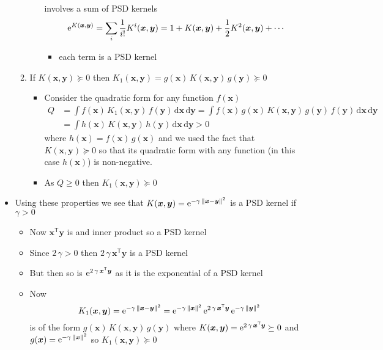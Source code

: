 \documentclass[11pt]{article}
\newcommand{\tr}{\textsf{T}}
\newcommand{\len}[1]{\left\| #1 \right\|}
\newcommand{\e}[1]{{\rm e}^{#1}}
\newcommand{\dd}{\mathrm{d}}
\begin{document}
\begin{itemize}
\begin{enumerate}
\begin{itemize}
involves a sum of PSD kernels
$$\e{K(\bm{x}, \bm{y})} = \sum_i \frac{1}{i!} K^i(\bm{x}, \bm{y})
          = 1 + K(\bm{x}, \bm{y}) + \frac{1}{2} K^2(\bm{x}, \bm{y}) +
           \cdots $$
\begin{itemize}
\item each term is a PSD kernel
\end{itemize}
\end{itemize}
\item If  \(K(\bm{x},\bm{y})\succeq0\) then
\(K_{1}(\bm{x}, \bm{y}) = g(\bm{x})\,K(\bm{x},\bm{y})\,g(\bm{y})
         \succeq 0\)
\begin{itemize}
\item Consider the quadratic form for any function \(f(\bm{x})\)
\begin{align*}
Q &= \int f(\bm{x})\, K_{1}(\bm{x}, \bm{y})\, f(\bm{y}) \, \dd
\bm{x} \, \dd \bm{y}
= \int f(\bm{x})\, g(\bm{x})\,K(\bm{x},\bm{y})\,g(\bm{y})\, f(\bm{y}) \, \dd
\bm{x} \, \dd \bm{y} \\
&=  \int h(\bm{x})\, K(\bm{x}, \bm{y})\, h(\bm{y}) \, \dd
\bm{x} \, \dd \bm{y} > 0
\end{align*}
where \(h(\bm{x}) = f(\bm{x})\,g(\bm{x})\) and we used the fact
that \(K(\bm{x}, \bm{y})\succeq 0\) so that its quadratic form
with any function (in this case \(h(\bm{x})\)) is non-negative.
\item As \(Q\geq0\) then \(K_{1}(\bm{x}, \bm{y}) \succeq0\)
\end{itemize}
\end{enumerate}
\item Using these properties we see that \(K(\bm{x}, \bm{y}) =
     \e{-\gamma\,\len{\bm{x}-\bm{y}}^2}\) is a PSD kernel if \(\gamma>0\)
\begin{itemize}
\item Now \(\bm{x}^\tr \bm{y}\) is and inner product so a PSD kernel
\item Since \(2\,\gamma>0\) then \(2\,\gamma\,\bm{x}^\tr \bm{y}\) is a
PSD kernel
\item But then so is \(\e{2\,\gamma\,\bm{x}^\tr \bm{y}}\) as it is the
exponential of a PSD kernel
\item Now
$$ K_{1}(\bm{x},\bm{y}) = \e{-\gamma\,\len{\bm{x}-\bm{y}}^2} =
       \e{-\gamma\,\|\bm{x}\|^2}\,\e{2\,\gamma\,\bm{x}^\tr \bm{y}} \,
       \e{-\gamma\,\|\bm{y}\|^2} $$
is of the form \(g(\bm{x})\,K(\bm{x},\bm{y})\,g(\bm{y})\) where
\(K(\bm{x},\bm{y}) = \e{2\,\gamma\,\bm{x}^\tr \bm{y}}\succeq 0\)
and \(g(\bm{x}) = \e{-\gamma\,\|\bm{x}\|^2}\) so
\(K_{1}(\bm{x},\bm{y})  \succeq0\)

\end{itemize}
\end{itemize}
\end{document}
